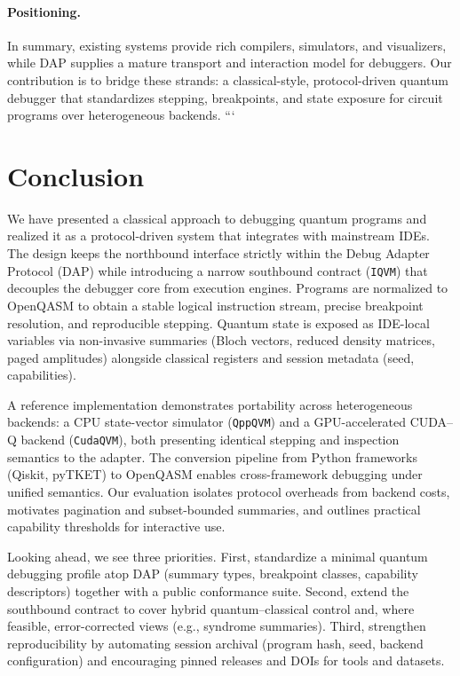 \documentclass[12pt]{article}
\begin{document}
\begin{itemize}
\paragraph{Positioning.}
In summary, existing systems provide rich compilers, simulators, and visualizers, while DAP supplies a mature transport and interaction model for debuggers. Our contribution is to bridge these strands: a classical-style, protocol-driven quantum debugger that standardizes stepping, breakpoints, and state exposure for circuit programs over heterogeneous backends.
```

\section{Conclusion}
\label{sec:conclusion}

We have presented a classical approach to debugging quantum programs and realized it as a protocol-driven system that integrates with mainstream IDEs. The design keeps the northbound interface strictly within the Debug Adapter Protocol (DAP) while introducing a narrow southbound contract (\texttt{IQVM}) that decouples the debugger core from execution engines. Programs are normalized to OpenQASM to obtain a stable logical instruction stream, precise breakpoint resolution, and reproducible stepping. Quantum state is exposed as IDE-local variables via non-invasive summaries (Bloch vectors, reduced density matrices, paged amplitudes) alongside classical registers and session metadata (seed, capabilities).

A reference implementation demonstrates portability across heterogeneous backends: a CPU state-vector simulator (\texttt{QppQVM}) and a GPU-accelerated CUDA--Q backend (\texttt{CudaQVM}), both presenting identical stepping and inspection semantics to the adapter. The conversion pipeline from Python frameworks (Qiskit, pyTKET) to OpenQASM enables cross-framework debugging under unified semantics. Our evaluation isolates protocol overheads from backend costs, motivates pagination and subset-bounded summaries, and outlines practical capability thresholds for interactive use.

Looking ahead, we see three priorities. First, standardize a minimal quantum debugging profile atop DAP (summary types, breakpoint classes, capability descriptors) together with a public conformance suite. Second, extend the southbound contract to cover hybrid quantum--classical control and, where feasible, error-corrected views (e.g., syndrome summaries). Third, strengthen reproducibility by automating session archival (program hash, seed, backend configuration) and encouraging pinned releases and DOIs for tools and datasets.


\end{itemize}
\end{document}

